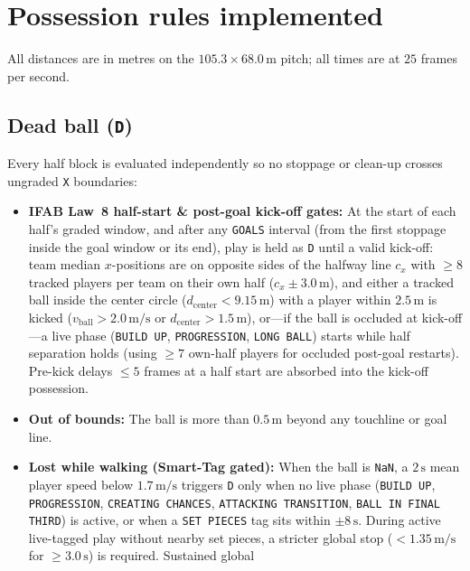 \documentclass[11pt,a4paper]{article}
\newcommand{\code}[1]{\texttt{#1}}
\begin{document}
\section{Possession rules implemented}

All distances are in metres on the $105.3 \times 68.0$\,m pitch; all times are at $25$ frames per
second.

\subsection{Dead ball (\code{D})}

Every half block is evaluated independently so no stoppage or clean-up crosses ungraded \code{X}
boundaries:

\begin{itemize}
  \item \textbf{IFAB Law~8 half-start \& post-goal kick-off gates:} At the start of each half's
        graded window, and after any \code{GOALS} interval (from the first stoppage inside the goal
        window or its end), play is held as \code{D} until a valid kick-off: team median
        $x$-positions are on opposite sides of the halfway line $c_x$ with $\ge 8$ tracked players
        per team on their own half ($c_x \pm 3.0\,\text{m}$), and either a tracked ball inside the
        center circle ($d_{\text{center}} < 9.15\,\text{m}$) with a player within $2.5\,\text{m}$
        is kicked ($v_{\text{ball}} > 2.0\,\text{m/s}$ or $d_{\text{center}} > 1.5\,\text{m}$),
        or---if the ball is occluded at kick-off---a live phase (\code{BUILD UP}, \code{PROGRESSION},
        \code{LONG BALL}) starts while half separation holds (using $\ge 7$ own-half players for
        occluded post-goal restarts). Pre-kick delays $\le 5$ frames at a half start are absorbed
        into the kick-off possession.
  \item \textbf{Out of bounds:} The ball is more than $0.5\,\text{m}$ beyond any touchline or goal
        line.
  \item \textbf{Lost while walking (Smart-Tag gated):} When the ball is \code{NaN}, a $2\,\text{s}$
        mean player speed below $1.7\,\text{m/s}$ triggers \code{D} only when no live phase
        (\code{BUILD UP}, \code{PROGRESSION}, \code{CREATING CHANCES}, \code{ATTACKING TRANSITION},
        \code{BALL IN FINAL THIRD}) is active, or when a \code{SET PIECES} tag sits within
        $\pm 8\,\text{s}$. During active live-tagged play without nearby set pieces, a stricter
        global stop ($< 1.35\,\text{m/s}$ for $\ge 3.0\,\text{s}$) is required. Sustained global

\end{itemize}
\end{document}
